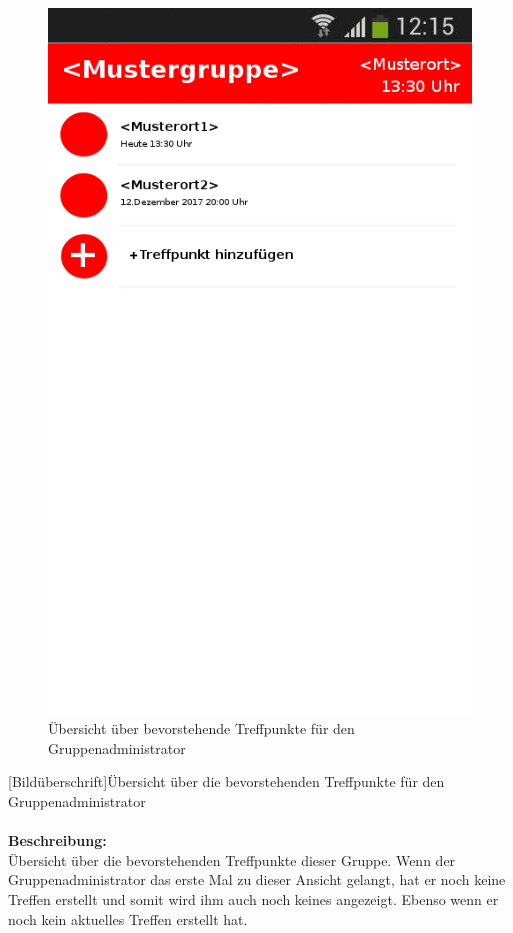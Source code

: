 \begin{figure} [H]
	\caption{Übersicht über bevorstehende Treffpunkte für den Gruppenadministrator}
	\includegraphics[scale =0.5]{resources/images/treffpunktuebersicht_Admin.png}
\end{figure}
[Bildüberschrift]Übersicht über die bevorstehenden Treffpunkte für den Gruppenadministrator\\ \\
\textbf{Beschreibung:}\\
Übersicht über die bevorstehenden Treffpunkte dieser Gruppe. Wenn der Gruppenadministrator das erste Mal zu dieser Ansicht gelangt, hat er noch keine Treffen erstellt und somit wird ihm auch noch keines angezeigt. Ebenso wenn er noch kein aktuelles Treffen erstellt hat.\\

